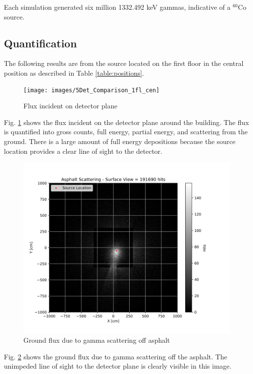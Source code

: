 \noindent Each simulation generated six million 1332.492 keV gammas, indicative of a $^{60}$Co source.

\subsection{Quantification}
\noindent The following results are from the source located on the first floor in the central position as described in Table \ref{table:positions}.

\begin{figure}[!htb]
  \centering
  \texttt{[image: images/5Det\_Comparison\_1fl\_cen]}
  \caption{Flux incident on detector plane}
  \label{fig:DetFlux1C}
\end{figure}

Fig. \ref{fig:DetFlux1C} shows the flux incident on the detector plane around the building. The flux is quantified into gross counts, full energy, partial energy, and scattering from the ground. There is a large amount of full energy depositions because the source location provides a clear line of sight to the detector.

\begin{figure}[!htb]
  \centering
  \includegraphics[width=\columnwidth]{images/10Asphalt_Scattered_1fl_cen}
  \caption{Ground flux due to gamma scattering off asphalt}
  \label{fig:AsScat1C}
\end{figure}

Fig. \ref{fig:AsScat1C} shows the ground flux due to gamma scattering off the asphalt. The unimpeded line of sight to the detector plane is clearly visible in this image.

